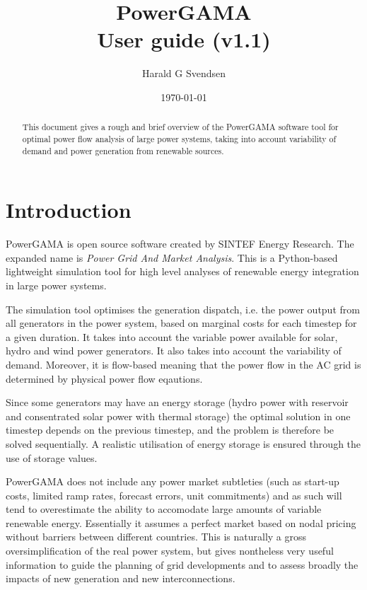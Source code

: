 \documentclass{article}
\title{PowerGAMA\\User guide (v1.1)}
\author{Harald G Svendsen}
\date{\today}
\begin{document}
\maketitle

\begin{abstract}
This document gives a rough and brief overview of the PowerGAMA software tool for optimal power flow analysis of large power systems, taking into account variability of demand and power generation from renewable sources.
\end{abstract}

\tableofcontents


\newpage
\section{Introduction}
PowerGAMA is open source software created by SINTEF Energy Research. The expanded name is \emph{Power Grid And Market Analysis}. This is a Python-based  lightweight simulation tool for high level analyses of renewable energy integration in large power systems.

The simulation tool optimises the generation dispatch, i.e. the power output from all generators in the power system, based on marginal costs for each timestep for a given duration.  It takes into account the variable power available for solar, hydro and wind power generators. It also takes into account the variability of demand. Moreover, it is flow-based meaning that the power flow in the AC grid is determined by physical power flow eqautions. 

Since some generators may have an energy storage (hydro power with reservoir and consentrated solar power with thermal storage) the optimal solution in one timestep depends on the previous timestep, and the problem is  therefore be solved sequentially.  A realistic utilisation of energy storage is ensured through the use of storage values.


PowerGAMA does not include any power market subtleties (such as start-up costs, limited ramp rates, forecast errors, unit commitments) and as such will tend to overestimate the ability to accomodate large amounts of variable renewable energy. Essentially it assumes a perfect market based on nodal pricing without barriers between different countries. This is naturally a gross oversimplification of the real power system, but gives nontheless very useful information to guide the planning of grid developments and to assess broadly the impacts of new generation and new interconnections.
\end{document}
